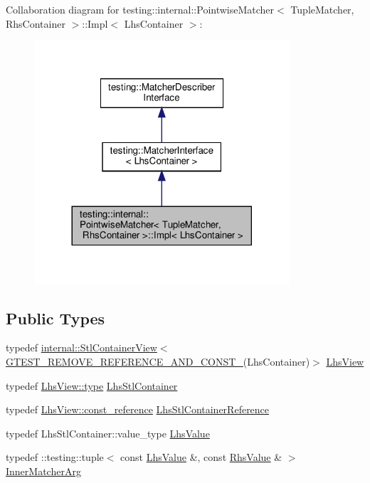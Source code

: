 Collaboration diagram for testing\+:\+:internal\+:\+:Pointwise\+Matcher$<$ Tuple\+Matcher, Rhs\+Container $>$\+:\+:Impl$<$ Lhs\+Container $>$\+:
\nopagebreak
\begin{figure}[H]
\begin{center}
\leavevmode
\includegraphics[width=269pt]{classtesting_1_1internal_1_1_pointwise_matcher_1_1_impl__coll__graph}
\end{center}
\end{figure}
\subsection*{Public Types}
\begin{DoxyCompactItemize}
\item 
typedef \hyperlink{classtesting_1_1internal_1_1_stl_container_view}{internal\+::\+Stl\+Container\+View}$<$ \hyperlink{gtest-internal_8h_a874567b176266188fabfffb8393267ce}{G\+T\+E\+S\+T\+\_\+\+R\+E\+M\+O\+V\+E\+\_\+\+R\+E\+F\+E\+R\+E\+N\+C\+E\+\_\+\+A\+N\+D\+\_\+\+C\+O\+N\+S\+T\+\_\+}(Lhs\+Container)$>$ \hyperlink{classtesting_1_1internal_1_1_pointwise_matcher_1_1_impl_a5240abc710bb0a5bedfd180bf6701fae}{Lhs\+View}
\item 
typedef \hyperlink{classtesting_1_1internal_1_1_stl_container_view_a2b2c63a6dcdbfe63fb0ee121ebf463ba}{Lhs\+View\+::type} \hyperlink{classtesting_1_1internal_1_1_pointwise_matcher_1_1_impl_a23420b57b4cd6d83cec8afda746c27f2}{Lhs\+Stl\+Container}
\item 
typedef \hyperlink{classtesting_1_1internal_1_1_stl_container_view_a9cd4f6ed689b3938cdb7b3c4cbf1b36b}{Lhs\+View\+::const\+\_\+reference} \hyperlink{classtesting_1_1internal_1_1_pointwise_matcher_1_1_impl_a9df3eb0866f76d59dbdd35fafeb5590c}{Lhs\+Stl\+Container\+Reference}
\item 
typedef Lhs\+Stl\+Container\+::value\+\_\+type \hyperlink{classtesting_1_1internal_1_1_pointwise_matcher_1_1_impl_a453769e721f4212e399f76c980b4b65c}{Lhs\+Value}
\item 
typedef \+::testing\+::tuple$<$ const \hyperlink{classtesting_1_1internal_1_1_pointwise_matcher_1_1_impl_a453769e721f4212e399f76c980b4b65c}{Lhs\+Value} \&, const \hyperlink{classtesting_1_1internal_1_1_pointwise_matcher_a9f7f1abbfa795033e1e1c1df385b4617}{Rhs\+Value} \& $>$ \hyperlink{classtesting_1_1internal_1_1_pointwise_matcher_1_1_impl_aba9d983881cbfbb37724b8b40e863898}{Inner\+Matcher\+Arg}
\end{DoxyCompactItemize}
